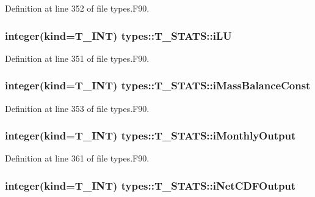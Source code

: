 Definition at line 352 of file types.F90.

\hypertarget{typetypes_1_1_t___s_t_a_t_s_a045c76162dcdf4837f2f848823b16254}{
\subsubsection[{iLU}]{\setlength{\rightskip}{0pt plus 5cm}integer(kind={\bf T\_\-INT}) {\bf types::T\_\-STATS::iLU}}}
\label{typetypes_1_1_t___s_t_a_t_s_a045c76162dcdf4837f2f848823b16254}


Definition at line 351 of file types.F90.

\hypertarget{typetypes_1_1_t___s_t_a_t_s_aad67d55a488e20d13ecdc72c12b9e1c9}{
\subsubsection[{iMassBalanceConst}]{\setlength{\rightskip}{0pt plus 5cm}integer(kind={\bf T\_\-INT}) {\bf types::T\_\-STATS::iMassBalanceConst}}}
\label{typetypes_1_1_t___s_t_a_t_s_aad67d55a488e20d13ecdc72c12b9e1c9}


Definition at line 353 of file types.F90.

\hypertarget{typetypes_1_1_t___s_t_a_t_s_a77fd876612b391731e80b9dc510bb361}{
\subsubsection[{iMonthlyOutput}]{\setlength{\rightskip}{0pt plus 5cm}integer(kind={\bf T\_\-INT}) {\bf types::T\_\-STATS::iMonthlyOutput}}}
\label{typetypes_1_1_t___s_t_a_t_s_a77fd876612b391731e80b9dc510bb361}


Definition at line 361 of file types.F90.

\hypertarget{typetypes_1_1_t___s_t_a_t_s_a6b3732c4976d703eb1710e526814f97a}{
\subsubsection[{iNetCDFOutput}]{\setlength{\rightskip}{0pt plus 5cm}integer(kind={\bf T\_\-INT}) {\bf types::T\_\-STATS::iNetCDFOutput}}}
\label{typetypes_1_1_t___s_t_a_t_s_a6b3732c4976d703eb1710e526814f97a}


